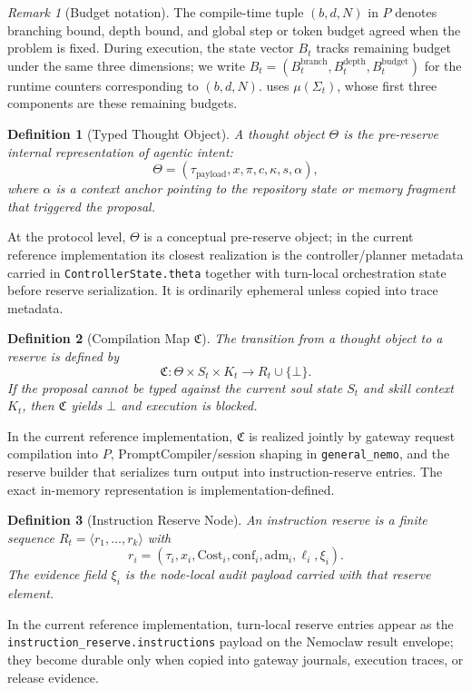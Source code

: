 \documentclass[11pt]{article}
\newtheorem{definition}{Definition}[section]
\theoremstyle{remark}
\newtheorem{remark}{Remark}[section]
\newcommand{\Cost}{\mathrm{Cost}}
\begin{document}
\begin{remark}[Budget notation]\label{rem:budget-notation}
The compile-time tuple $(b,d,N)$ in $P$ denotes branching bound, depth bound, and global step or token budget agreed when the problem is fixed.
During execution, the state vector $B_t$ tracks remaining budget under the same three dimensions; we write $B_t=(B_t^{\mathrm{branch}},B_t^{\mathrm{depth}},B_t^{\mathrm{budget}})$ for the runtime counters corresponding to $(b,d,N)$.
 uses $\mu(\Sigma_t)$, whose first three components are these remaining budgets.
\end{remark}

\begin{definition}[Typed Thought Object]
A thought object \(\Theta\) is the pre-reserve internal representation of agentic intent:
\[
\Theta=(\tau_{\text{payload}},x,\pi,c,\kappa,s,\alpha),
\]
where \(\alpha\) is a context anchor pointing to the repository state or memory fragment that triggered the proposal.
\end{definition}
At the protocol level, \(\Theta\) is a conceptual pre-reserve object; in the current reference implementation its closest realization is the controller/planner metadata carried in \texttt{ControllerState.theta} together with turn-local orchestration state before reserve serialization. It is ordinarily ephemeral unless copied into trace metadata.

\begin{definition}[Compilation Map \(\mathfrak{C}\)]
The transition from a thought object to a reserve is defined by
\[
\mathfrak{C} : \Theta \times S_t \times K_t \to R_t \cup \{\bot\}.
\]
If the proposal cannot be typed against the current soul state \(S_t\) and skill context \(K_t\), then \(\mathfrak{C}\) yields \(\bot\) and execution is blocked.
\end{definition}
In the current reference implementation, \(\mathfrak{C}\) is realized jointly by gateway request compilation into \(P\), PromptCompiler/session shaping in \texttt{general\_nemo}, and the reserve builder that serializes turn output into instruction-reserve entries. The exact in-memory representation is implementation-defined.

\begin{definition}[Instruction Reserve Node]
An instruction reserve is a finite sequence \(R_t=\langle r_1,\dots,r_k\rangle\) with
\[
r_i=(\tau_i,x_i,\Cost_i,\mathrm{conf}_i,\mathrm{adm}_i,\ell_i,\xi_i).
\]
The evidence field \(\xi_i\) is the node-local audit payload carried with that reserve element.
\end{definition}
In the current reference implementation, turn-local reserve entries appear as the \texttt{instruction\_reserve.instructions} payload on the Nemoclaw result envelope; they become durable only when copied into gateway journals, execution traces, or release evidence.
\end{document}
